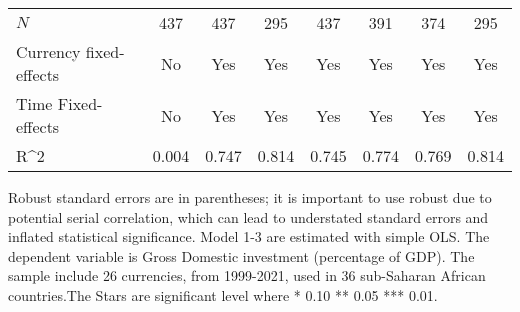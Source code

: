 \begin{table}[H]
\begin{adjustbox}{max width=\textwidth}
\begin{tabular}{l*{7}{c}}
\midrule
\(N\)       &         437         &         437         &         295         &         437         &         391         &         374         &         295         \\
Currency fixed-effects&          No         &         Yes         &         Yes         &         Yes         &         Yes         &         Yes         &         Yes         \\
Time Fixed-effects&          No         &         Yes         &         Yes         &         Yes         &         Yes         &         Yes         &         Yes         \\
R^{2}       &       0.004         &       0.747         &       0.814         &       0.745         &       0.774         &       0.769         &       0.814         \\
\bottomrule \end{tabular} \end{adjustbox} \footnotesize \item Robust standard errors are in parentheses; it is important to use robust due to potential serial correlation, which can lead to understated standard errors and inflated statistical significance. Model 1-3 are estimated with simple OLS. The dependent variable is Gross Domestic investment (percentage of GDP). The sample include 26 currencies, from 1999-2021, used in 36 sub-Saharan African countries.The Stars are significant level where * 0.10 ** 0.05 *** 0.01. \end{table}
